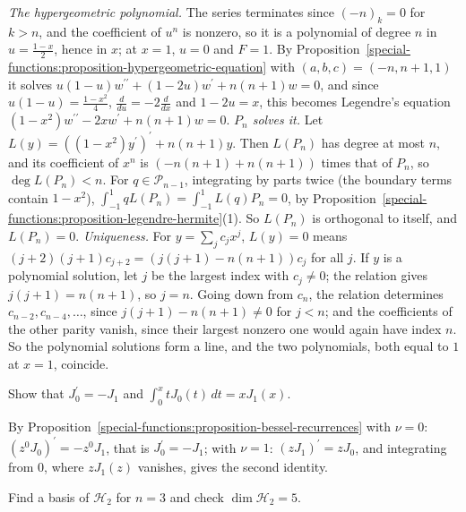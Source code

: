 \begin{solution}
\emph{The hypergeometric polynomial.} The series terminates since $(-n)_k = 0$ for $k > n$, and the coefficient of $u^n$ is nonzero, so it is a polynomial of degree $n$ in $u = \frac{1 - x}{2}$, hence in $x$;
at $x = 1$, $u = 0$ and $F = 1$. By Proposition~\ref{special-functions:proposition-hypergeometric-equation} with $(a, b, c) = (-n, n + 1, 1)$ it solves $u(1 - u)w^{\prime\prime} + (1 - 2u)w^{\prime} + n(n + 1)w = 0$, and since
$u(1 - u) = \frac{1 - x^2}{4}$, $\frac{d}{du} = -2\frac{d}{dx}$ and $1 - 2u = x$, this becomes Legendre's equation $(1 - x^2)w^{\prime\prime} - 2xw^{\prime} + n(n + 1)w = 0$.
\emph{$P_n$ solves it.} Let $L(y) = ((1 - x^2)y^{\prime})^{\prime} + n(n + 1)y$. Then $L(P_n)$ has degree at most $n$, and its coefficient of $x^n$ is $(-n(n + 1) + n(n + 1))$ times that of $P_n$, so $\deg L(P_n) < n$. For
$q \in \mathcal{P}_{n-1}$, integrating by parts twice (the boundary terms contain $1 - x^2$), $\int_{-1}^1qL(P_n) = \int_{-1}^1L(q)P_n = 0$, by Proposition~\ref{special-functions:proposition-legendre-hermite}(1). So $L(P_n)$ is orthogonal to
itself, and $L(P_n) = 0$.
\emph{Uniqueness.} For $y = \sum_jc_jx^j$, $L(y) = 0$ means $(j + 2)(j + 1)c_{j+2} = (j(j + 1) - n(n + 1))c_j$ for all $j$. If $y$ is a polynomial solution, let $j$ be the largest index with $c_j \neq 0$; the relation gives
$j(j + 1) = n(n + 1)$, so $j = n$. Going down from $c_n$, the relation determines $c_{n-2}, c_{n-4}, \ldots$, since $j(j + 1) - n(n + 1) \neq 0$ for $j < n$; and the coefficients of the other parity vanish, since their
largest nonzero one would again have index $n$. So the polynomial solutions form a line, and the two polynomials, both equal to $1$ at $x = 1$, coincide.
\end{solution}

\begin{exercise}\label{special-functions:exercise-bessel-integral}
Show that $J_0^{\prime} = -J_1$ and $\int_0^xtJ_0(t)\,dt = xJ_1(x)$.
\end{exercise}

\begin{solution}
By Proposition~\ref{special-functions:proposition-bessel-recurrences} with $\nu = 0$: $(z^0J_0)^{\prime} = -z^0J_1$, that is $J_0^{\prime} = -J_1$; with $\nu = 1$: $(zJ_1)^{\prime} = zJ_0$, and integrating from $0$, where $zJ_1(z)$ vanishes,
gives the second identity.
\end{solution}

\begin{exercise}\label{special-functions:exercise-harmonic-degree-two}
Find a basis of $\mathcal{H}_2$ for $n = 3$ and check $\dim\mathcal{H}_2 = 5$.
\end{exercise}

